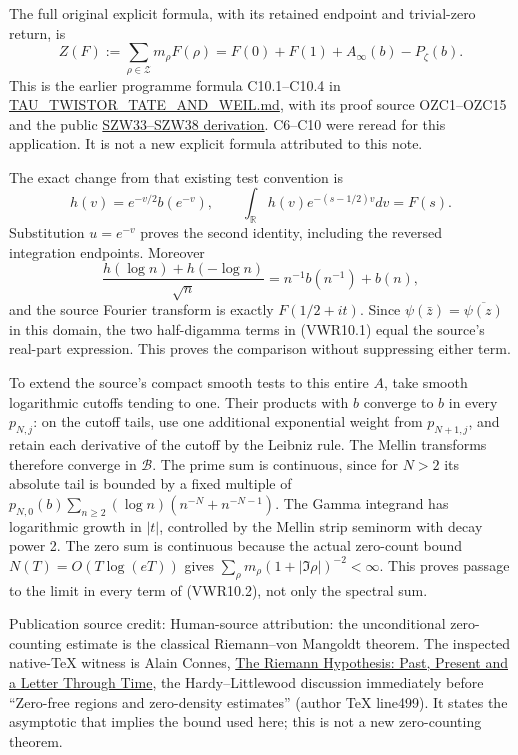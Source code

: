 The full original explicit formula, with its retained endpoint and
trivial-zero return, is \[
Z(F):=\sum_{\rho\in\mathscr Z}m_\rho F(\rho)
=F(0)+F(1)+A_\infty(b)-P_\zeta(b).
\tag{VWR10.2}
\] This is the earlier programme formula C10.1--C10.4 in
\href{https://github.com/KokunoYumeto/zeta-function-research-reader/blob/36a82ecca98addb8a98b48204e349737856c7223/workbenches/splitzero-tandem/continuations/20260924-cohomology-weight-and-character-lifts/gct-weight-control/proofs/TAU_TWISTOR_TATE_AND_WEIL.md}{TAU\_TWISTOR\_TATE\_AND\_WEIL.md},
with its proof source OZC1--OZC15 and the public
\href{https://github.com/KokunoYumeto/zeta-function-research-reader/blob/76f421965914beb133df797835f940849844dc4f/workbenches/splitzero-tandem/branches/tau-zero-prime-positivity/SUPPORTED_ZERO_PRIME_WEIL_DERIVATION.md}{SZW33--SZW38
derivation}. C6--C10 were reread for this application. It is not a new
explicit formula attributed to this note.

The exact change from that existing test convention is \[
h(v)=e^{-v/2}b(e^{-v}),\qquad
\int_{\mathbb R}h(v)e^{-(s-1/2)v}dv=F(s).
\tag{VWR10.3}
\] Substitution \(u=e^{-v}\) proves the second identity, including the
reversed integration endpoints. Moreover \[
\frac{h(\log n)+h(-\log n)}{\sqrt n}
=n^{-1}b(n^{-1})+b(n),
\] and the source Fourier transform is exactly \(F(1/2+it)\). Since
\(\psi(\bar z)=\overline{\psi(z)}\) in this domain, the two half-digamma
terms in (VWR10.1) equal the source's real-part expression. This proves
the comparison without suppressing either term.

To extend the source's compact smooth tests to this entire \(A\), take
smooth logarithmic cutoffs tending to one. Their products with \(b\)
converge to \(b\) in every \(p_{N,j}\): on the cutoff tails, use one
additional exponential weight from \(p_{N+1,j}\), and retain each
derivative of the cutoff by the Leibniz rule. The Mellin transforms
therefore converge in \(\mathcal B\). The prime sum is continuous, since
for \(N>2\) its absolute tail is bounded by a fixed multiple of
\(p_{N,0}(b)\sum_{n\ge2}(\log n)(n^{-N}+n^{-N-1})\). The Gamma integrand
has logarithmic growth in \(|t|\), controlled by the Mellin strip
seminorm with decay power 2. The zero sum is continuous because the
actual zero-count bound \(N(T)=O(T\log(eT))\) gives
\(\sum_\rho m_\rho(1+|\Im\rho|)^{-2}<\infty\). This proves passage to
the limit in every term of (VWR10.2), not only the spectral sum.

Publication source credit: Human-source attribution: the unconditional
zero-counting estimate is the classical Riemann--von Mangoldt theorem.
The inspected native-TeX witness is Alain Connes,
\href{https://arxiv.org/abs/2602.04022v1}{The Riemann Hypothesis: Past,
Present and a Letter Through Time}, the Hardy--Littlewood discussion
immediately before ``Zero-free regions and zero-density estimates''
(author TeX line499). It states the asymptotic that implies the bound
used here; this is not a new zero-counting theorem.

